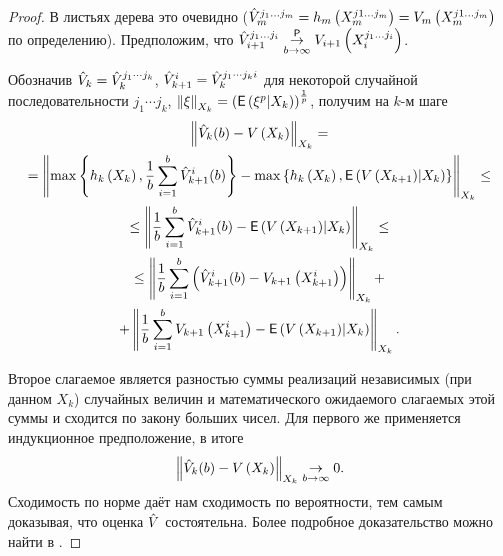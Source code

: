 	\begin{proof}
		\par В листьях дерева это очевидно ($\hat{V}_m^{j_1 \ldots j_m} = h_m\left(X_m^{j1 \ldots j_m}\right) = V_m\left(X_m^{j1 \ldots j_m}\right)$ по определению). Предположим, что $\hat{V}_{i+1}^{j_1\ldots j_i} \underset{b\to\infty}{\overset{\mathsf{P}}{\to}} V_{i+1}\left(X_i^{j_1\ldots j_i}\right)$. 

		Обозначив $\hat{V}_k = \hat{V}_k^{j_1\cdots j_k}$, $\hat{V}_{k+1}^i = \hat{V}_k^{j_1\cdots j_k i}$ для некоторой случайной последовательности $j_1\cdots j_k$, $\left\lVert\xi\right\rVert_{X_k} = \left(\mathsf{E}\left(\xi^p\middle\vert X_k\right)\right)^{1\over p}$, получим на $k$-м шаге
		\begin{multline*}
			\left\lVert\hat{V}_k(b) - V\left(X_k\right)\right\rVert_{X_k} = \\ 
			= \left\lVert
				\max\left\lbrace
					h_k\left(X_k\right), \frac{1}{b}\sum_{i=1}^b \hat{V}_{k+1}^i(b)
				\right\rbrace - \max\left\lbrace
					h_k\left(X_k\right), \mathsf{E}\left(V\left(X_{k+1}\right) \middle\vert X_k\right)\right\rbrace
			\right\rVert_{X_k} \leq \\
			\leq \left\lVert\frac{1}{b}\sum_{i=1}^b \hat{V}_{k+1}^i(b) - \mathsf{E}\left(V\left(X_{k+1}\right) \middle\vert X_k\right)\right\rVert_{X_k} \leq \\
			\leq \left\lVert
				\frac{1}{b}\sum_{i=1}^b  
				\left(\hat{V}_{k+1}^i(b) - V_{k+1}\left(X_{k+1}^i\right)\right)
			\right\rVert_{X_k} + \\ +\left\lVert
				\frac{1}{b}\sum_{i=1}^b   V_{k+1}\left(X_{k+1}^i\right) - 
				\mathsf{E}\left(V\left(X_{k+1}\right) \middle\vert X_k\right)
			\right\rVert_{X_k}.
		\end{multline*}

		Второе слагаемое является разностью суммы реализаций независимых (при данном $X_k$) случайных величин и математического ожидаемого слагаемых этой суммы и сходится по закону больших чисел. Для первого же применяется индукционное предположение, в итоге $$\left\lVert\hat{V}_k(b) - V\left(X_k\right)\right\rVert_{X_k} \underset{b\to\infty}{\to} 0.$$
	Сходимость по норме даёт нам сходимость по вероятности, тем самым доказывая, что оценка $\hat{V}$ состоятельна. Более подробное доказательство можно найти в \cite{Broadie1997}.
	\end{proof}
